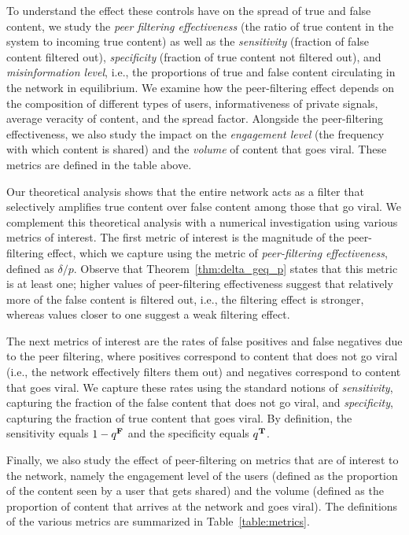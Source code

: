 To understand the effect these controls have on the spread of true and false content, we  study the \emph{peer filtering effectiveness} (the ratio of true content in the system to incoming true content) as well as the \emph{sensitivity} (fraction of false content filtered out), \emph{specificity} (fraction of true content not filtered out), and \emph{misinformation level}, i.e., the proportions of true and false content circulating in the network in equilibrium. We examine how the peer-filtering effect depends on the composition of different types of users, informativeness of private signals, average veracity of content, and the spread factor. Alongside the peer-filtering effectiveness, we also study the impact on the \emph{engagement level} (the frequency with which content is shared) and the \emph{volume} of content that goes viral. These metrics are defined in the table above. 


Our theoretical analysis shows that the entire network acts as a filter that selectively amplifies true content over false content among those that go viral. We  complement this theoretical analysis with a numerical investigation using various metrics of interest. The first metric of interest is the magnitude of the peer-filtering effect, which we capture using the metric of {\em peer-filtering effectiveness}, defined as $\delta/p$. Observe that Theorem~\ref{thm:delta_geq_p} states that this metric is at least one; higher values of peer-filtering effectiveness suggest that relatively more of the false content is filtered out, i.e., the filtering effect is stronger, whereas values closer to one suggest a weak filtering effect. 

The next metrics of interest are the rates of false positives and false negatives due to the peer filtering, where positives correspond to content that does not go viral (i.e., the network effectively filters them out) and negatives correspond to content that goes viral. We capture these rates using the standard notions of {\em sensitivity}, capturing the fraction of the false content that does not go viral, and {\em specificity}, capturing the fraction of true content that goes viral. By definition, the sensitivity equals $1- q^{\mathbf{F}}$ and the specificity equals $q^{\mathbf{T}}$. 

Finally, we also study the effect of peer-filtering on metrics that are of interest to the network, namely the engagement level of the users (defined as the proportion of the content seen by a user that gets shared) and the volume (defined as the proportion of content that arrives at the network and goes viral). The definitions of the various metrics are summarized in Table~\ref{table:metrics}.


